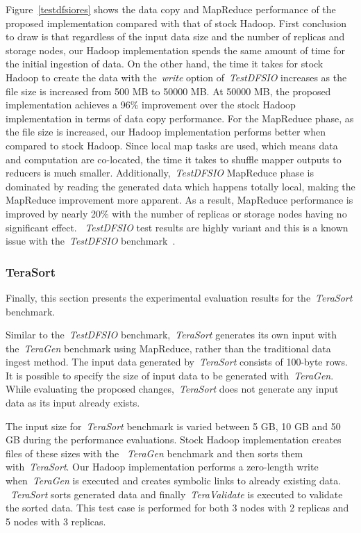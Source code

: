 \documentclass[preprint,12pt]{elsarticle}
\begin{document}
Figure~\ref{testdfsiores} shows the data copy and MapReduce performance of the proposed implementation
compared with that of stock Hadoop. First conclusion to draw is that regardless of the input data size
and the number of replicas and storage nodes, our Hadoop implementation spends the same amount of time
for the initial ingestion of data. On the other hand, the time it takes for stock Hadoop to create the
data with the~\textit{write} option of~\textit{TestDFSIO} increases as the file size is increased
from 500 MB to 50000 MB. At 50000 MB, the proposed implementation achieves a 96\% improvement over the stock
Hadoop implementation in terms of data copy performance. For the MapReduce phase, as the file size
is increased, our Hadoop implementation performs better when compared to stock Hadoop.
Since local map tasks are used, which means data and computation are co-located, the time it takes
to shuffle mapper outputs to reducers is much smaller. Additionally,~\textit{TestDFSIO}
MapReduce phase is dominated by reading the generated data which happens totally local,
making the MapReduce improvement more apparent. As a result, MapReduce performance is improved
by nearly 20\% with the number of replicas or storage nodes having no significant effect.
~\textit{TestDFSIO} test results are highly variant and this is a known issue with
the~\textit{TestDFSIO} benchmark~\cite{hdfs941}.

\subsubsection{TeraSort}
Finally, this section presents the experimental evaluation results for the~\textit{TeraSort} benchmark.

Similar to the~\textit{TestDFSIO} benchmark,~\textit{TeraSort} generates its own input
with the~\textit{TeraGen} benchmark using MapReduce, rather than the traditional
data ingest method. The input data generated by~\textit{TeraSort} consists of 100-byte rows.
It is possible to specify the size of input data to be generated with~\textit{TeraGen}. While
evaluating the proposed changes,~\textit{TeraSort} does not generate any input data as its input
already exists.

The input size for~\textit{TeraSort} benchmark is varied between 5 GB, 10 GB and 50 GB during
the performance evaluations. Stock Hadoop implementation creates files of these sizes with the
~\textit{TeraGen} benchmark and then sorts them with~\textit{TeraSort}. Our Hadoop implementation performs
a zero-length write when~\textit{TeraGen} is executed and creates symbolic links to already existing data.
~\textit{TeraSort} sorts generated data and finally~\textit{TeraValidate} is executed to validate the
sorted data. This test case is performed for both 3 nodes with 2 replicas and 5 nodes with 3 replicas.
\end{document}

